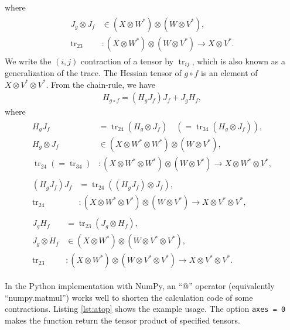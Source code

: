 \documentclass[a4paper]{article}
\newcommand{\jac}{J}
\newcommand{\hes}{H}
\newcommand{\parens}[1]{\left(#1\right)}
\newcommand{\tr}{\mathop{\mathrm{tr}}\nolimits}
\begin{document}
where
\begin{align}
    \begin{aligned}
        \jac_g \otimes \jac_f &\in \parens{X \otimes W^*} \otimes \parens{W \otimes V^*}, \\
        \tr_{23} & : \parens{X \otimes W^*} \otimes \parens{W \otimes V^*} \to
        X \otimes V^*.
    \end{aligned}
\end{align}
We write the $(i, j)$ contraction of a tensor by $\tr_{ij}$,
which is also known as a generalization of the trace.
The Hessian tensor of $g\circ f$ is an element of
$X \otimes V^* \otimes V^*$.
From the chain-rule, we have
\begin{align}
    \hes_{g\circ f} =
    \parens{\hes_g \jac_f} \jac_f +
    \jac_g \hes_f,
\end{align}
where
\begin{align}
    \begin{aligned}
        \hes_g \jac_f & = \tr_{24}\parens{\hes_g \otimes \jac_f}
        \quad\parens{= \tr_{34}\parens{\hes_g \otimes \jac_f}},\\
        \hes_g \otimes \jac_f &\in (X \otimes W^* \otimes W^*) \otimes (W \otimes V^*),\\
        \tr_{24}\parens{= \tr_{34}} &: (X \otimes W^* \otimes W^*) \otimes (W \otimes V^*) \to
        X \otimes W^* \otimes V^*,
    \end{aligned}
    \\[15pt]
    \begin{aligned}
        \parens{\hes_g \jac_f} \jac_f &= \tr_{24}\parens{\parens{\hes_g \jac_f} \otimes \jac_f},\\
        \tr_{24} &: \parens{X \otimes W^* \otimes V^*} \otimes \parens{W \otimes V^*}
        \to X \otimes V^* \otimes V^*,
    \end{aligned}\label{eq:hjj}
    \\[15pt]
    \begin{aligned}
        \jac_g \hes_f &= \tr_{23}\parens{\jac_g \otimes \hes_f},\\
        \jac_g \otimes \hes_f &\in (X \otimes W^*) \otimes (W \otimes V^* \otimes V^*),\\
        \tr_{23} &: (X \otimes W^*) \otimes (W \otimes V^* \otimes V^*) \to
        X \otimes V^* \otimes V^*.
    \end{aligned}\label{eq:jh}
\end{align}

In the Python implementation with NumPy, an ``@'' operator (equivalently ``numpy.matmul'') works well
to shorten the calculation code of some contractions.
Listing \ref{lst:atop} shows the example usage.
The option \texttt{axes = 0} makes the function return the tensor product of specified tensors.
\end{document}
